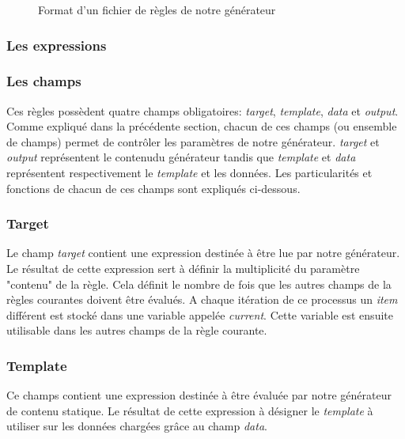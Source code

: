 		\begin{figure}[!]
			\centering
			
			\caption{Format d'un fichier de règles de notre générateur}
			\label{fig:rule:format}
		\end{figure}
		
	\subsubsection*{Les expressions}
	
	\subsubsection*{Les champs}
		Ces règles possèdent quatre champs obligatoires: \textit{target}, \textit{template}, \textit{data} et \textit{output}. Comme expliqué dans la précédente section, chacun de ces champs (ou ensemble de champs) permet de  contrôler les paramètres de notre générateur. \textit{target} et \textit{output} représentent le contenudu générateur tandis que \textit{template} et \textit{data} représentent respectivement le \textit{template} et les données. Les particularités et fonctions de chacun de ces champs sont expliqués ci-dessous.
		
		
		\subsubsection*{Target}
			Le champ \textit{target} contient une expression destinée à être lue par notre générateur. Le résultat de cette expression sert à définir la multiplicité du paramètre "contenu" de la règle. Cela définit le nombre de fois que les autres champs de la règles courantes doivent être évalués. A chaque itération de ce processus un \textit{item} différent est stocké dans une variable appelée \textit{current}. Cette variable est ensuite utilisable dans les autres champs de la règle courante.
		
		\subsubsection*{Template}
			Ce champs contient une expression destinée à être évaluée par notre générateur de contenu statique. Le résultat de cette expression à désigner le \textit{template} à utiliser sur les données chargées grâce au champ \textit{data}.\\
			
